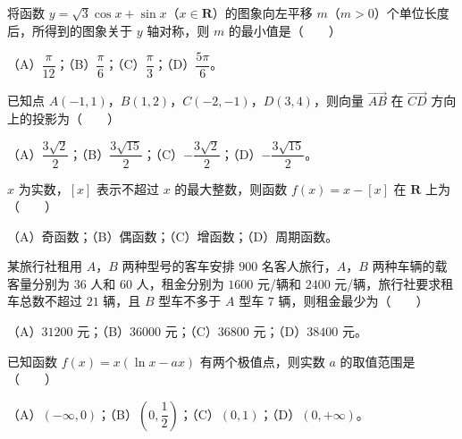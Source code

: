 \begin{question}
将函数 $y=\sqrt3\cos x+\sin x$（$x\in\mathbf R$）的图象向左平移 $m$（$m>0$）个单位长度后，所得到的图象关于 $y$ 轴对称，则 $m$ 的最小值是\mbox{（　　）}

（A）$\dfrac\pi{12}$；（B）$\dfrac\pi6$；（C）$\dfrac\pi3$；（D）$\dfrac{5\pi}6$。

\end{question}
\begin{question}
已知点 $A(-1,1)$，$B(1,2)$，$C(-2,-1)$，$D(3,4)$，则向量 $\overrightarrow{AB}$ 在 $\overrightarrow{CD}$ 方向上的投影为\mbox{（　　）}

（A）$\dfrac{3\sqrt2}2$；（B）$\dfrac{3\sqrt{15}}2$；（C）$-\dfrac{3\sqrt2}2$；（D）$-\dfrac{3\sqrt{15}}2$。

\end{question}
\begin{question}
$x$ 为实数，$[x]$ 表示不超过 $x$ 的最大整数，则函数 $f(x)=x-[x]$ 在 $\mathbf R$ 上为\mbox{（　　）}

（A）奇函数；（B）偶函数；（C）增函数；（D）周期函数。

\end{question}
\begin{question}
某旅行社租用 $A$，$B$ 两种型号的客车安排 $900$ 名客人旅行，$A$，$B$ 两种车辆的载客量分别为 $36$ 人和 $60$ 人，租金分别为 $1600$ 元/辆和 $2400$ 元/辆，旅行社要求租车总数不超过 $21$ 辆，且 $B$ 型车不多于 $A$ 型车 $7$ 辆，则租金最少为\mbox{（　　）}

（A）$31200$ 元；（B）$36000$ 元；（C）$36800$ 元；（D）$38400$ 元。

\end{question}
\begin{question}
已知函数 $f(x)=x(\ln x-ax)$ 有两个极值点，则实数 $a$ 的取值范围是\mbox{（　　）}

（A）$(-\infty,0)$；（B）$\left(0,\dfrac12\right)$；（C）$(0,1)$；（D）$(0,+\infty)$。

\end{question}

